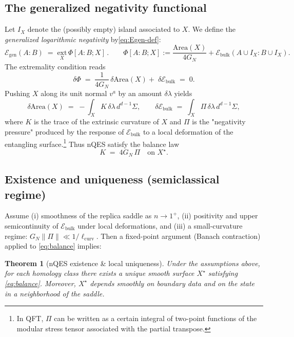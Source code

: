 \documentclass[11pt]{article}
\newtheorem{theorem}{Theorem}
\newcommand{\Area}{\mathrm{Area}}
\newcommand{\E}{\mathcal{E}}
\begin{document}
\subsection{The generalized negativity functional}
Let $I_X$ denote the (possibly empty) island associated to $X$.
We define the \emph{generalized logarithmic negativity} by\~\eqref{eq:Egen-def}:
\begin{equation}
  \E_{\mathrm{gen}}(A:B) \;=\; \underset{X}{\mathrm{ext}}\,\Phi[A:B;X]\,.
  \qquad
  \Phi[A:B;X] := \frac{\Area(X)}{4G_N}+\E_{\mathrm{bulk}}(A\cup I_X:B\cup I_X).
\end{equation}
The extremality condition reads
\begin{equation}
  \delta \Phi \;=\; \frac{1}{4G_N}\,\delta \Area(X)+\;\delta \E_{\mathrm{bulk}} \;=\; 0.
  \label{eq:EL}
\end{equation}
Pushing $X$ along its unit normal $v^a$ by an amount $\delta\lambda$ yields
\begin{equation}
  \delta \Area(X) \;=\; -\!\int_X K\,\delta\lambda\, d^{d-1}\Sigma,
  \qquad
  \delta \E_{\mathrm{bulk}} \;=\; \int_X \Pi\,\delta\lambda\, d^{d-1}\Sigma,
\end{equation}
where $K$ is the trace of the extrinsic curvature of $X$ and $\Pi$ is the "negativity pressure" produced by the response of $\E_{\mathrm{bulk}}$ to a local deformation of the entangling surface.\footnote{In QFT, $\Pi$ can be written as a certain integral of two-point functions of the modular stress tensor associated with the partial transpose.}
Thus nQES satisfy the balance law
\begin{equation}
  K \;=\; 4G_N\, \Pi \quad \text{on } X^\star.
  \label{eq:balance}
\end{equation}

\subsection{Existence and uniqueness (semiclassical regime)}
Assume (i) smoothness of the replica saddle as $n\rightarrow 1^+$, (ii) positivity and upper semicontinuity of $\E_{\mathrm{bulk}}$ under local deformations, and (iii) a small-curvature regime: $G_N \|\Pi\|\ll 1/\ell_{\mathrm{curv}}$.
Then a fixed-point argument (Banach contraction) applied to \eqref{eq:balance} implies:
\begin{theorem}[nQES existence \& local uniqueness]
Under the assumptions above, for each homology class there exists a unique smooth surface $X^\star$ satisfying \eqref{eq:balance}. Moreover, $X^\star$ depends smoothly on boundary data and on the state in a neighborhood of the saddle.
\end{theorem}
\end{document}
